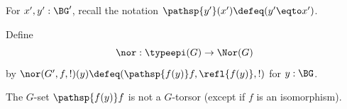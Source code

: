 




For $x',y':\BG'$, recall the notation $\pathsp{y'}(x')\defeq(y'\eqto x')$.
\begin{definition}
  \label{def:ker2}
  Define $$\nor:\typeepi(G)\to\Nor(G)$$
  by $\nor(G',f,!)(y)\defeq(\pathsp{f(y)}f,\refl{f(y)},!)$ for $y:\BG$.
\end{definition}
\begin{remark}
  The $G$-set $\pathsp{f(y)}f$ is not a $G$-torsor (except if $f$ is an isomorphism).
\end{remark}

